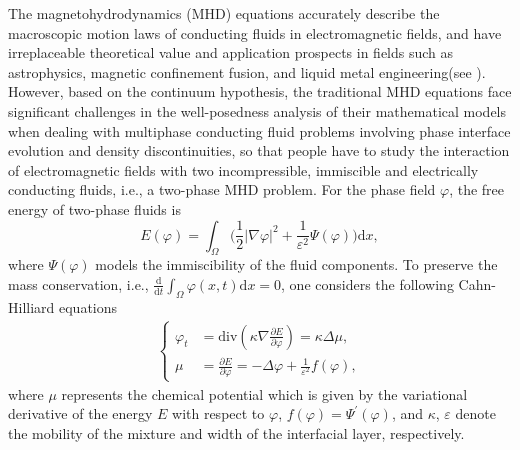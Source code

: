 \documentclass[11pt]{article}
\numberwithin{equation}{section}
\begin{document}
The magnetohydrodynamics (MHD) equations accurately describe the macroscopic motion laws of conducting fluids in electromagnetic fields, and have irreplaceable theoretical value and application prospects in fields such as astrophysics, magnetic confinement fusion, and liquid metal engineering(see \cite{NPX,UM,xu2}). However, based on the continuum hypothesis, the traditional MHD equations face significant challenges in the well-posedness analysis of their mathematical models when dealing with multiphase conducting fluid problems involving phase interface evolution and density discontinuities\cite{MSBKT}, so that people have to study  the interaction of electromagnetic fields with two incompressible, immiscible and electrically conducting fluids, i.e., a two-phase MHD problem. For the phase field $\varphi$, the free energy of two-phase fluids is
$$E(\varphi)=\int_\Omega\big(\frac{1}{2}|\nabla\varphi|^2+\frac{1}{\varepsilon^2}\Psi(\varphi)\big)\mathrm{d}x,$$
where $\Psi(\varphi)$ models the immiscibility of the fluid components.
To preserve the mass conservation, i.e., $\frac{\mathrm{d}}{\mathrm{d}t}\int_{\Omega}\varphi(x,t)\mathrm{d}x=0$,  one  considers the following  Cahn-Hilliard equations
\begin{align}
\left\{
\begin{aligned}
\varphi_t&=\mathrm{div}\left(\kappa\nabla\frac{\partial E}{\partial\varphi}\right)=\kappa\Delta \mu,\\
\mu&=\frac{\partial E}{\partial\varphi}=-\Delta\varphi+\frac{1}{\varepsilon^2}f(\varphi),
\end{aligned}
\right.
\end{align}
where $\mu$ represents the chemical potential which is given by the variational derivative of the energy $E$ with respect
to $\varphi$, $f(\varphi)=\Psi^{\prime}(\varphi)$, and $\kappa$, $\varepsilon$ denote the mobility of the mixture and width of the interfacial layer, respectively.
\end{document}
